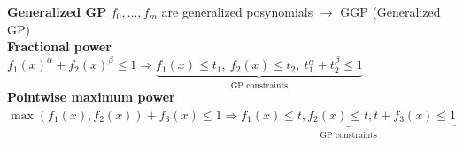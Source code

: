 \documentclass[a4paper]{article}
\begin{document}
\noindent
\textbf{Generalized GP} $f_0, ..., f_m$ are generalized posynomials $\to$ GGP (Generalized GP)\\
{\small{\textbf{Fractional power}}} $f_1(x)^\alpha + f_2(x)^\beta\le1 \Rightarrow \underbrace{f_1(x)\le{t_1}, \ f_2(x)\le{t_2}, \ t_1^\alpha+t_2^\beta\le1}_{\text{GP constraints}}$  \\
{\small{\textbf{Pointwise maximum power}}} $\max(f_1(x), f_2(x))+f_3(x)\le1 \Rightarrow 
\underbrace{f_1(x)\le{t}, f_2(x)\le{t}, t+f_3(x)\le1}_{\text{GP constraints}}$ 
\end{document}
